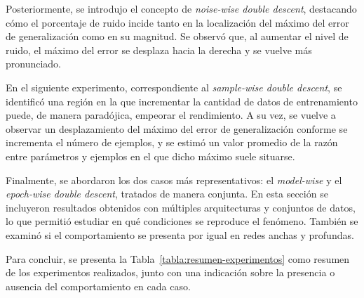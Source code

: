 Posteriormente, se introdujo el concepto de \textit{noise-wise double descent}, destacando cómo el porcentaje de ruido incide tanto en la localización del máximo del error de generalización como en su magnitud. Se observó que, al aumentar el nivel de ruido, el máximo del error se desplaza hacia la derecha y se vuelve más pronunciado.

En el siguiente experimento, correspondiente al \textit{sample-wise double descent}, se identificó una región en la que incrementar la cantidad de datos de entrenamiento puede, de manera paradójica, empeorar el rendimiento. A su vez, se vuelve a observar un desplazamiento del máximo del error de generalización conforme se incrementa el número de ejemplos, y se estimó un valor promedio de la razón entre parámetros y ejemplos en el que dicho máximo suele situarse.

Finalmente, se abordaron los dos casos más representativos: el \textit{model-wise} y el \textit{epoch-wise double descent}, tratados de manera conjunta. En esta sección se incluyeron resultados obtenidos con múltiples arquitecturas y conjuntos de datos, lo que permitió estudiar en qué condiciones se reproduce el fenómeno. También se examinó si el comportamiento se presenta por igual en redes anchas y profundas.

Para concluir, se presenta la Tabla~\ref{tabla:resumen-experimentos} como resumen de los experimentos realizados, junto con una indicación sobre la presencia o ausencia del comportamiento en cada caso.

